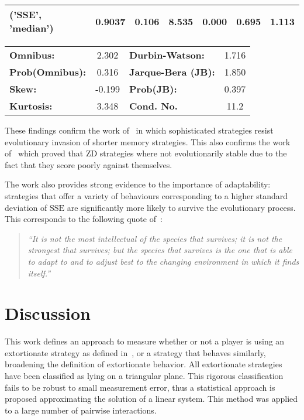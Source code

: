 \documentclass[10pt,letterpaper]{article}
\newcommand{\SSe}{\text{SSE}}
\begin{document}
\begin{table}[!hbtp]
\begin{tabular}{lcccccc}
\textbf{('SSE', 'median')} &       0.9037  &        0.106     &     8.535  &         0.000        &        0.695    &        1.113     \\
\hline
\end{tabular}
\begin{tabular}{lclc}
\hline
\textbf{Omnibus:}       &  2.302 & \textbf{  Durbin-Watson:     } &    1.716  \\
\textbf{Prob(Omnibus):} &  0.316 & \textbf{  Jarque-Bera (JB):  } &    1.850  \\
\textbf{Skew:}          & -0.199 & \textbf{  Prob(JB):          } &    0.397  \\
\textbf{Kurtosis:}      &  3.348 & \textbf{  Cond. No.          } &     11.2  \\
\hline
\end{tabular}
\end{table}


These findings confirm the work of~\cite{Moran1707} in which sophisticated
strategies resist evolutionary invasion of shorter memory strategies. This also
confirms the work of~\cite{adami2013evolutionary, hilbe2015partners} which
proved that ZD strategies where not evolutionarily stable due to the fact that
they score poorly against themselves.

The work also provides strong evidence to the importance of adaptability:
strategies that offer a variety of behaviours corresponding to a higher standard
deviation of \(\SSe\) are significantly more likely to survive the
evolutionary process. This corresponds to the following quote
of~\cite{darwin1869origin}:

\begin{quote}

    \textit{``It is not the most intellectual of the species that survives; it is not the
strongest that survives; but the species that survives is the one that is able
to adapt to and to adjust best to the changing environment in which it finds
itself.''
}

\end{quote}

\section*{Discussion}

This work defines an approach to measure whether or not a player is using an
extortionate strategy as defined in~\cite{Press2012}, or a strategy that behaves
similarly, broadening the definition of extortionate behavior. All extortionate
strategies have been classified as lying on a triangular plane. This rigorous
classification fails to be robust to small measurement error, thus a statistical
approach is proposed approximating the solution of a linear system.
This method
was applied to a large number of pairwise interactions.
\end{document}
